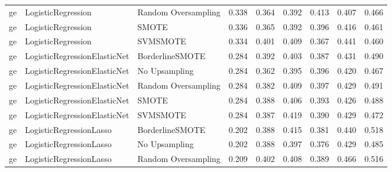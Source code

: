 \begin{tabular}{lllllllll}
      ge &           LogisticRegression & Random Oversampling & 0.338 &                     0.364 &                 0.392 &                  0.413 &                                   0.407 &     0.466 \\
      ge &           LogisticRegression &               SMOTE & 0.336 &                     0.365 &                 0.392 &                  0.396 &                                   0.416 &     0.461 \\
      ge &           LogisticRegression &            SVMSMOTE & 0.334 &                     0.401 &                 0.409 &                  0.367 &                                   0.441 &     0.460 \\
      ge & LogisticRegressionElasticNet &     BorderlineSMOTE & 0.284 &                     0.392 &                 0.403 &                  0.387 &                                   0.431 &     0.490 \\
      ge & LogisticRegressionElasticNet &       No Upsampling & 0.284 &                     0.362 &                 0.395 &                  0.396 &                                   0.420 &     0.467 \\
      ge & LogisticRegressionElasticNet & Random Oversampling & 0.284 &                     0.382 &                 0.409 &                  0.397 &                                   0.429 &     0.491 \\
      ge & LogisticRegressionElasticNet &               SMOTE & 0.284 &                     0.388 &                 0.406 &                  0.393 &                                   0.426 &     0.488 \\
      ge & LogisticRegressionElasticNet &            SVMSMOTE & 0.284 &                     0.387 &                 0.419 &                  0.390 &                                   0.429 &     0.472 \\
      ge &      LogisticRegressionLasso &     BorderlineSMOTE & 0.202 &                     0.388 &                 0.415 &                  0.381 &                                   0.440 &     0.518 \\
      ge &      LogisticRegressionLasso &       No Upsampling & 0.202 &                     0.388 &                 0.397 &                  0.376 &                                   0.429 &     0.485 \\
      ge &      LogisticRegressionLasso & Random Oversampling & 0.209 &                     0.402 &                 0.408 &                  0.389 &                                   0.466 &     0.516 \\

\end{tabular}
